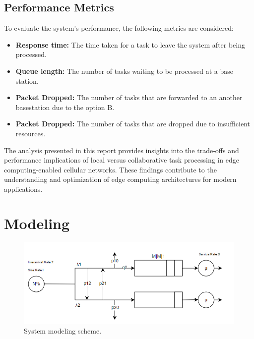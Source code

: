 \documentclass{report}
\begin{document}
\section{Performance Metrics}

To evaluate the system's performance, the following metrics are considered:
\begin{itemize}
    \item \textbf{Response time:} The time taken for a task to leave the system after being processed.
    \item \textbf{Queue length:} The number of tasks waiting to be processed at a base station.
    \item \textbf{Packet Dropped:} The number of tasks that are forwarded to an another basestation due to the option B.
    \item \textbf{Packet Dropped:} The number of tasks that are dropped due to insufficient resources.
\end{itemize}
The analysis presented in this report provides insights into the trade-offs and performance implications of local versus collaborative task processing in edge computing-enabled cellular networks. These findings contribute to the understanding and optimization of edge computing architectures for modern applications.

\chapter{Modeling}

\begin{figure}[H]
    \centering
    \includegraphics[width=\textwidth]{img/immagine.png}
    \caption{System modeling scheme.}
    \label{scheme}
\end{figure}
\end{document}
